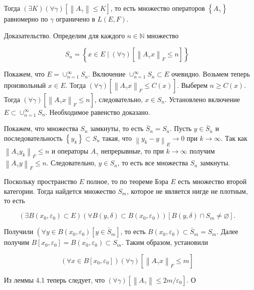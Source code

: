 Тогда $(\exists K)(\forall \gamma)\left[\left\|A_{\gamma}\right\| \leq K\right]$, то есть множество операторов $\left\{A_{\gamma}\right\}$ равномерно по $\gamma$ ограничено в $L(E, F)$.

Доказательство. Определим для каждого $n \in \mathbb{N}$ множество

$$
S_{n}=\left\{x \in E \mid(\forall \gamma)\left[\left\|A_{\gamma} x\right\|_{F} \leq n\right]\right\}
$$

Покажем, что $E=\cup_{n=1}^{\infty} S_{n}$. Включение $\cup_{n=1}^{\infty} S_{n} \subset E$ очевидно. Возьмем теперь произвольный $x \in E$. Тогда $(\forall \gamma)\left[\left\|A_{\gamma} x\right\|_{F} \leq C(x)\right]$. Выберем $n \geq C(x)$. Тогда $(\forall \gamma)\left[\left\|A_{\gamma} x\right\|_{F} \leq n\right]$, следовательно, $x \in S_{n}$. Установлено включение $E \subset \cup_{n=1}^{\infty} S_{n}$. Необходимое равенство доказано.

Покажем, что множества $S_{n}$ замкнуты, то есть $\bar{S}_{n}=S_{n}$. Пусть $y \in \bar{S}_{n}$ и последовательность $\left\{y_{k}\right\} \subset S_{n}$ такая, что $\left\|y_{k}-y\right\|_{E} \rightarrow 0$ при $k \rightarrow \infty$. Так как $\left\|A_{\gamma} y_{k}\right\|_{F} \leq n$ и операторы $A_{\gamma}$ непрерывные, то при $k \rightarrow \infty$ получим $\left\|A_{\gamma} y\right\|_{F} \leq n$. Следовательно, $y \in S_{n}$, то есть все множества $S_{n}$ замкнуты.

Поскольку пространство $E$ полное, то по теореме Бэра $E$ есть множество второй категории. Тогда найдется множество $S_{m}$, которое не является нигде не плотным, то есть

$$
\left(\exists B\left(x_{0}, \varepsilon_{0}\right) \subset E\right)\left(\forall B(y, \delta) \subset B\left(x_{0}, \varepsilon_{0}\right)\right)\left[B(y, \delta) \cap S_{m} \neq \varnothing\right] .
$$

Получили $\left(\forall y \in B\left(x_{0}, \varepsilon_{0}\right)\left[y \in \bar{S}_{m}\right]\right.$, то есть $B\left(x_{0}, \varepsilon_{0}\right) \subset \bar{S}_{m}=S_{m}$. Далее получим $B\left[x_{0}, \varepsilon_{0}\right]=\overline{B\left(x_{0}, \varepsilon_{0}\right)} \subset S_{m}$. Таким образом, установили

$$
\left(\forall x \in B\left[x_{0}, \varepsilon_{0}\right]\right)(\forall \gamma)\left[\left\|A_{\gamma} x\right\|_{F} \leq m\right]
$$

Из леммы 4.1 теперь следует, что $(\forall \gamma)\left[\left\|A_{\gamma}\right\| \leq 2 m / \varepsilon_{0}\right]$. О

